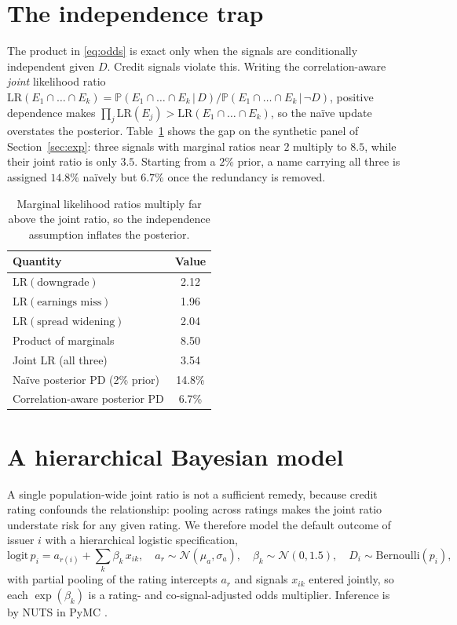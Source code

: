\documentclass[11pt]{article}
\newcommand{\PR}{\mathbb{P}}
\newcommand{\given}{\,\vert\,}
\newcommand{\LR}{\mathrm{LR}}
\begin{document}
\section{The independence trap}
The product in \eqref{eq:odds} is exact only when the signals are conditionally
independent given $D$. Credit signals violate this. Writing the correlation-aware
\emph{joint} likelihood ratio
$\LR(E_1\cap\dots\cap E_k)=\PR(E_1\cap\dots\cap E_k\given D)/
\PR(E_1\cap\dots\cap E_k\given \lnot D)$,
positive dependence makes
$\prod_j \LR(E_j) > \LR(E_1\cap\dots\cap E_k)$, so the na\"ive update overstates the
posterior. Table~\ref{tab:lr} shows the gap on the synthetic panel of
Section~\ref{sec:exp}: three signals with marginal ratios near $2$ multiply to $8.5$,
while their joint ratio is only $3.5$. Starting from a $2\%$ prior, a name carrying
all three is assigned $14.8\%$ na\"ively but $6.7\%$ once the redundancy is removed.

\begin{table}[h]
\centering
\begin{tabular}{lc}
\toprule
Quantity & Value \\
\midrule
$\LR(\text{downgrade})$        & 2.12 \\
$\LR(\text{earnings miss})$    & 1.96 \\
$\LR(\text{spread widening})$  & 2.04 \\
Product of marginals           & 8.50 \\
Joint $\LR$ (all three)        & 3.54 \\
\midrule
Na\"ive posterior PD (2\% prior)        & 14.8\% \\
Correlation-aware posterior PD          & \phantom{0}6.7\% \\
\bottomrule
\end{tabular}
\caption{Marginal likelihood ratios multiply far above the joint ratio, so the
independence assumption inflates the posterior.}
\label{tab:lr}
\end{table}

\section{A hierarchical Bayesian model}
A single population-wide joint ratio is not a sufficient remedy, because credit
rating confounds the relationship: pooling across ratings makes the joint ratio
understate risk for any given rating. We therefore model the default outcome of
issuer $i$ with a hierarchical logistic specification,
\begin{equation}
\mathrm{logit}\,p_i = a_{r(i)} + \sum_{k}\beta_k\,x_{ik},\quad
a_r \sim \mathcal{N}(\mu_a,\sigma_a),\quad
\beta_k \sim \mathcal{N}(0,1.5),\quad
D_i \sim \mathrm{Bernoulli}(p_i),
\end{equation}
with partial pooling of the rating intercepts $a_r$ and signals $x_{ik}$ entered
jointly, so each $\exp(\beta_k)$ is a rating- and co-signal-adjusted odds multiplier.
Inference is by NUTS in PyMC \citep{pymc2023,gelman2013}.
\end{document}
